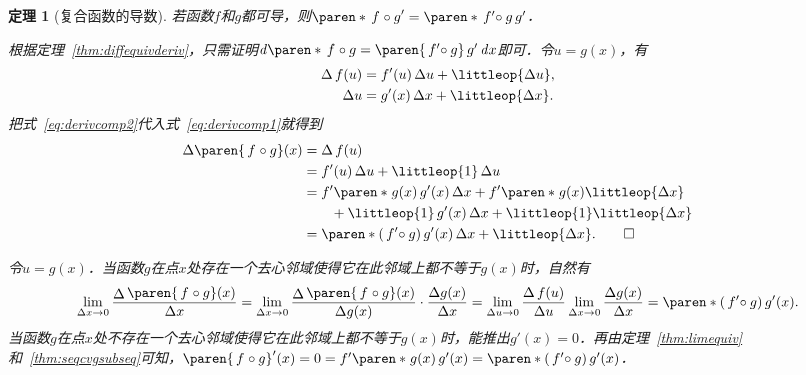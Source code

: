\documentclass[a4paper,punct=CCT]{ctexbook}
\makeatletter
\newtheorem{theorem}{定理}
\theoremstyle{definition}
\theoremstyle{remark}
\renewcommand*{\proofname}{证}
\renewenvironment{proof}[1][\proofname]{\par
  \pushQED{\qed}%
  \normalfont \topsep6\p@\@plus6\p@\relax
  \trivlist
  \item[\hskip\labelsep
    \bfseries
    #1%
    ]\ignorespaces
}{%
  \popQED\endtrivlist\@endpefalse
}
\makeatother
\begin{document}
\begin{theorem}[复合函数的导数]
  \label{thm:derivcomp}
  若函数\(f\)和\(g\)都可导，则\(\paren*{\,f\mkern1mu \circ g}' = \paren*{\,f'\mkern-4mu \circ g}\,g'\)．

  \begin{proof}
    根据定理~\ref{thm:diffequivderiv}，只需证明\(\diff\paren*{\,f\mkern1mu \circ g} =  \paren{\,f'\mkern-4mu \circ g}\,g' \dx\)即可．令\(u = g(x)\)，有
    \begin{align}
      \fwdf\,f(u)
      &= f'(u) \fdu + \littleop{\fdu},
        \label{eq:derivcomp1} \\
      \fdu
      &= g'(x) \fdx + \littleop{\fdx}.
        \label{eq:derivcomp2}
    \end{align}
    把式~\eqref{eq:derivcomp2}代入式~\eqref{eq:derivcomp1}就得到
    \begin{equation*}
      \begin{split}
        \fwdf\paren{\,f\mkern1mu \circ g}(x)
        &= \fwdf\,f(u) \\
        &= f'(u) \fdu + \littleop{1} \fdu \\
        &= f'\paren*{\mkern1mu g(x)}\,g'(x) \fdx + f'\paren*{\mkern1mu g(x)} \littleop{\fdx} \\
        &\qquad + \littleop{1}\,g'(x) \fdx + \littleop{1} \littleop{\fdx} \\
        &= \paren*{(\,f'\mkern-4mu \circ g)\,g'}(x) \fdx + \littleop{\fdx}.
        \qedhere
      \end{split}
    \end{equation*}
  \end{proof}
  \begin{proof}
    令\(u = g(x)\)．当函数\(g\)在点\(x\)处存在一个去心邻域使得它在此邻域上都不等于\(g(x)\)时，自然有
    \begin{equation*}
      \lim_{\fdx\to0} \frac{\Fn\Delta\paren{\,f\mkern1mu \circ g}(x)}{\fdx}
      = \lim_{\fdx\to0} \frac{\Fn\Delta\paren{\,f\mkern1mu \circ g}(x)}{\fwdf g(x)}
      \cdot \frac{\fwdf g(x)}{\fdx}
      = \lim_{\fdu\to0}\frac{\fwdf\,f(u)}{\fdu} \lim_{\fdx\to0} \frac{\fwdf g(x)}{\fdx}
      = \paren*{(\,f'\mkern-4mu \circ g)\,g'}(x).
    \end{equation*}
    当函数\(g\)在点\(x\)处不存在一个去心邻域使得它在此邻域上都不等于\(g(x)\)时，能推出\(g'(x) = 0\)．再由定理~\ref{thm:limequiv}和~\ref{thm:seqcvgsubseq}可知，\(\paren{\,f\mkern1mu \circ g}'(x) = 0 = f'\paren*{\mkern1mu g(x)}\,g'(x) = \paren*{(\,f'\mkern-4mu \circ g)\,g'}(x)\)．
  \end{proof}
\end{theorem}
\end{document}
